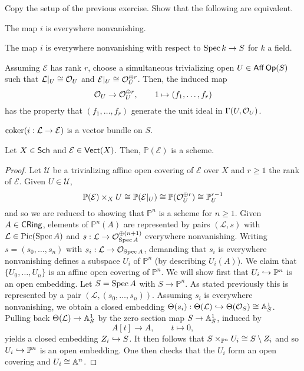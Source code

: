 \documentclass[11pt]{article}
\newcommand{\EE}{\mathcal{E}}
\renewcommand{\L}{\mathcal{L}}
\renewcommand{\P}{\mathbb{P}}
\newcommand{\U}{\mathscr{U}}
\begin{document}
\begin{exercise}
Copy the setup of the previous exercise. Show that the following are equivalent.
\begin{enum}{\roman}
\item The map $i$ is everywhere nonvanishing.

\item The map $i$ is everywhere nonvanishing with respect to $\operatorname{Spec} k\to S$ for $k$ a field.

\item Assuming $\EE$ has rank $r$, choose a simultaneous trivializing open $U\in\operatorname{\mathsf{Aff}}\operatorname{\mathsf{Op}}(S)$ such that $\L|_U\iso\O_U$ and $\EE|_U\iso\O_U^{\oplus r}$. Then, the induced map
$$\mathcal{O}_U\to\mathcal{O}_U^{\oplus r},\qquad 1\mapsto(f_1,\ldots,f_r)$$
has the property that $(f_1,\ldots,f_r)$ generate the unit ideal in $\Gamma(U,\mathcal{O}_U)$.

\item $\coker(i: \L\to\EE)$ is a vector bundle on $S$.
\end{enum}
\end{exercise}

\begin{theorem}
Let $X\in\operatorname{\mathsf{Sch}}$ and $\EE\in\Vect(X)$. Then, $\P(\EE)$ is a scheme.
\end{theorem}

\begin{proof}
Let $\U$ be a trivializing affine open covering of $\EE$ over $X$ and $r\geq1$ the rank of $\EE$. Given $U\in\U$,
$$\P(\EE)\times_XU\iso\P(\EE|_U)\iso\P(\O_U^{\oplus r})\iso\P_U^{r-1}$$
and so we are reduced to showing that $\P^n$ is a scheme for $n\geq1$. Given $A\in\operatorname{\mathsf{CRing}}$, elements of $\P^n(A)$ are represented by pairs $(\L,s)$ with $\L\in\Pic(\Spec A)$ and $s: \L\to\O_{\Spec A}^{\oplus(n+1)}$ everywhere nonvanishing. Writing $s=(s_0,\ldots,s_n)$ with $s_i: \L\to\O_{\Spec A}$, demanding that $s_i$ is everywhere nonvanishing defines a subspace $U_i$ of $\P^n$ (by describing $U_i(A)$). We claim that $\{U_0,\ldots,U_n\}$ is an affine open covering of $\P^n$. We will show first that $U_i\inj\P^n$ is an open embedding. Let $S=\operatorname{Spec} A$ with $S\to\P^n$. As stated previously this is represented by a pair $(\L,(s_0,\ldots,s_n))$. Assuming $s_i$ is everywhere nonvanishing, we obtain a closed embedding $\Theta(s_i): \Theta(\L)\inj\Theta(\O_S)\iso\A_S^1$. Pulling back $\Theta(\L)\to\A_S^1$ by the zero section map $S\to\mathbb{A}_S^1$, induced by 
$$A[t]\to A,\qquad t\mapsto0,$$
yields a closed embedding $Z_i\hookrightarrow S$. It then follows that $S\times_{\P^n}U_i\iso S\setminus Z_i$ and so $U_i\inj\P^n$ is an open embedding. One then checks that the $U_i$ form an open covering and $U_i\cong\mathbb{A}^n$.
\end{proof}
\end{document}
